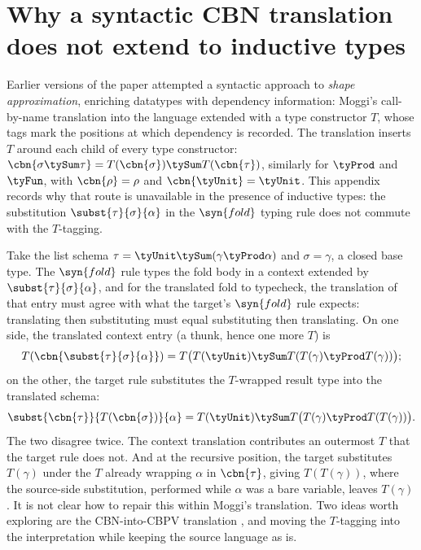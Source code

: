 \section{Why a syntactic CBN translation does not extend to inductive types}
\label{sec:polynomial-types:no-cbn}

Earlier versions of the paper attempted a syntactic approach to \emph{shape approximation},
enriching datatypes with dependency information: Moggi's call-by-name translation
\citep{notions-of-computation} into the language extended with a type constructor $T$, whose
tags mark the positions at which dependency is recorded. The translation inserts $T$ around each
child of every type constructor: $\cbn{\sigma \tySum \tau} = T(\cbn{\sigma}) \tySum T(\cbn{\tau})$,
similarly for $\tyProd$ and $\tyFun$, with $\cbn{\rho} = \rho$ and $\cbn{\tyUnit} = \tyUnit$. This
appendix records why that route is unavailable in the presence of inductive types: the substitution
$\subst{\tau}{\sigma}{\alpha}$ in the $\syn{fold}$ typing rule does not commute with the
$T$-tagging.

Take the list schema $\tau = \tyUnit \tySum (\gamma \tyProd \alpha)$ and $\sigma = \gamma$, a
closed base type. The $\syn{fold}$ rule types the fold body in a context extended by
$\subst{\tau}{\sigma}{\alpha}$, and for the translated fold to typecheck, the translation of that
entry must agree with what the target's $\syn{fold}$ rule expects: translating then substituting
must equal substituting then translating. On one side, the translated context entry (a thunk, hence
one more $T$) is
\[
  T(\cbn{\subst{\tau}{\sigma}{\alpha}}) =
  T\bigl(T(\tyUnit) \tySum T(T(\gamma) \tyProd T(\gamma))\bigr);
\]
on the other, the target rule substitutes the $T$-wrapped result type into the translated
schema:
\[
  \subst{\cbn{\tau}}{T(\cbn{\sigma})}{\alpha} =
  T(\tyUnit) \tySum T\bigl(T(\gamma) \tyProd T(T(\gamma))\bigr).
\]
The two disagree twice. The context translation contributes an outermost $T$ that the target
rule does not. And at the recursive position, the target substitutes $T(\gamma)$ under the $T$
already wrapping $\alpha$ in $\cbn{\tau}$, giving $T(T(\gamma))$, where the source-side
substitution, performed while $\alpha$ was a bare variable, leaves $T(\gamma)$. It is not clear how
to repair this within Moggi's translation. Two ideas worth exploring are the CBN-into-CBPV
translation \citep{levy2003}, and moving the $T$-tagging into the interpretation while keeping the
source language as is.
